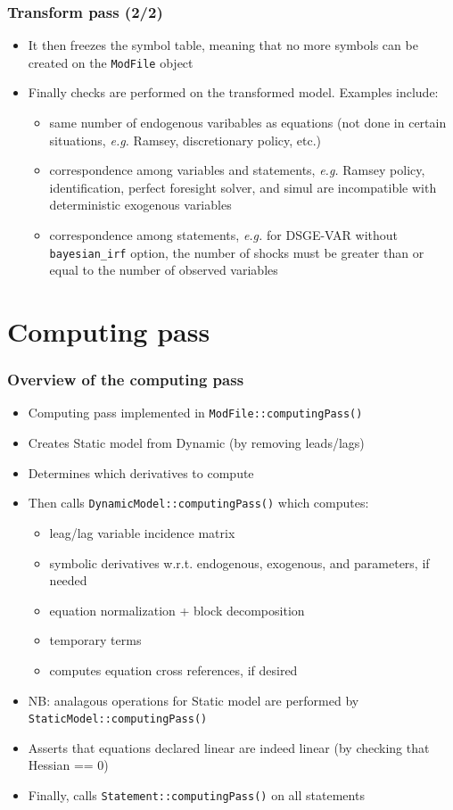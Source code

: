 \documentclass{beamer}
\begin{document}
\begin{frame}
  \frametitle{Transform pass (2/2)}
  \begin{itemize}
  \item It then freezes the symbol table, meaning that no more symbols can be created on the \texttt{ModFile} object
  \item Finally checks are performed on the transformed model. Examples include:
    \begin{itemize}
    \item same number of endogenous varibables as equations (not done in certain situations, \textit{e.g.} Ramsey, discretionary policy, etc.)
    \item correspondence among variables and statements, \textit{e.g.} Ramsey policy, identification, perfect foresight solver, and simul are incompatible with deterministic exogenous variables
    \item correspondence among statements, \textit{e.g.} for DSGE-VAR without \texttt{bayesian\_irf} option, the number of shocks must be greater than or equal to the number of observed variables
    \end{itemize}
  \end{itemize}
\end{frame}


\section{Computing pass}

\begin{frame}
  \frametitle{Overview of the computing pass}
  \begin{itemize}
  \item Computing pass implemented in \texttt{ModFile::computingPass()}
  \item Creates Static model from Dynamic (by removing leads/lags)
  \item Determines which derivatives to compute
  \item Then calls \texttt{DynamicModel::computingPass()} which computes:
    \begin{itemize}
    \item leag/lag variable incidence matrix
    \item symbolic derivatives w.r.t. endogenous, exogenous, and parameters, if needed
    \item equation normalization + block decomposition
    \item temporary terms
    \item computes equation cross references, if desired
    \end{itemize}
  \item NB: analagous operations for Static model are performed by \texttt{StaticModel::computingPass()}
  \item Asserts that equations declared linear are indeed linear (by checking that Hessian == 0)
  \item Finally, calls \texttt{Statement::computingPass()} on all statements
  \end{itemize}
\end{frame}
\end{document}
